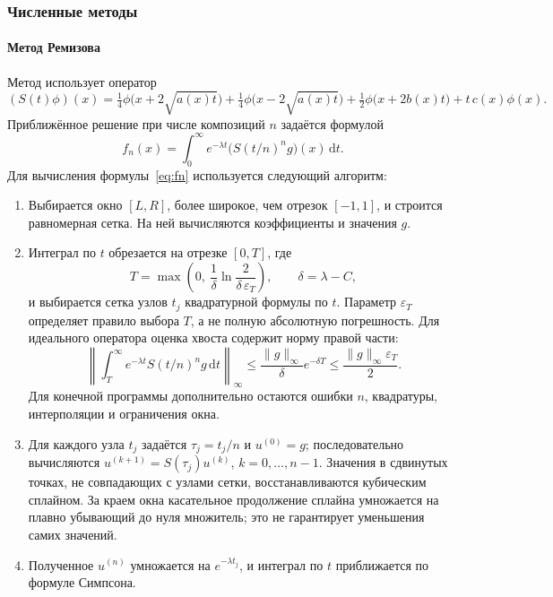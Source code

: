\documentclass[14pt,a4paper]{extarticle}
\newcommand{\dd}{\mathrm{d}}
\begin{document}
\subsubsection{Численные методы}\label{sec:ml-methods}
\paragraph{Метод Ремизова\\}
Метод использует оператор
\[
(S(t)\phi)(x)=\tfrac14\phi\bigl(x+2\sqrt{a(x)t}\bigr)
+\tfrac14\phi\bigl(x-2\sqrt{a(x)t}\bigr)
+\tfrac12\phi\bigl(x+2b(x)t\bigr)+t\,c(x)\phi(x).
\]
Приближённое решение при числе композиций $n$ задаётся формулой
\begin{equation}\label{eq:fn}
f_n(x)=\int_0^\infty e^{-\lambda t}\bigl(S(t/n)^ng\bigr)(x)\,\dd t.
\end{equation}
Для вычисления формулы~\eqref{eq:fn} используется следующий алгоритм:
\begin{enumerate}
\item Выбирается окно $[L,R]$, более широкое, чем отрезок $[-1,1]$,
и строится равномерная сетка. На ней вычисляются коэффициенты
и значения $g$.
\item Интеграл по $t$ обрезается на отрезке $[0,T]$, где
\[
T=\max\left(0,\ \frac1\delta\ln\frac{2}{\delta\,\varepsilon_T}\right),
\qquad \delta=\lambda-C,
\]
и выбирается сетка узлов $t_j$ квадратурной формулы по $t$.
Параметр $\varepsilon_T$ определяет правило выбора $T$, а не полную
абсолютную погрешность. Для идеального оператора оценка хвоста содержит
норму правой части:
\[
\left\|\int_T^\infty e^{-\lambda t}S(t/n)^ng\,\dd t\right\|_\infty
\le\frac{\|g\|_\infty}{\delta}e^{-\delta T}
\le\frac{\|g\|_\infty\varepsilon_T}{2}.
\]
Для конечной программы дополнительно остаются ошибки $n$, квадратуры,
интерполяции и ограничения окна.
\item Для каждого узла $t_j$ задаётся $\tau_j=t_j/n$ и $u^{(0)}=g$;
последовательно вычисляются $u^{(k+1)}=S(\tau_j)u^{(k)}$,
$k=0,\dots,n-1$. Значения в сдвинутых точках, не совпадающих с узлами
сетки, восстанавливаются кубическим сплайном. За краем окна
касательное продолжение сплайна умножается на плавно убывающий
до нуля множитель; это не гарантирует уменьшения самих значений.
\item Полученное $u^{(n)}$ умножается на $e^{-\lambda t_j}$, и интеграл
по $t$ приближается по формуле Симпсона.
\end{enumerate}
\end{document}
